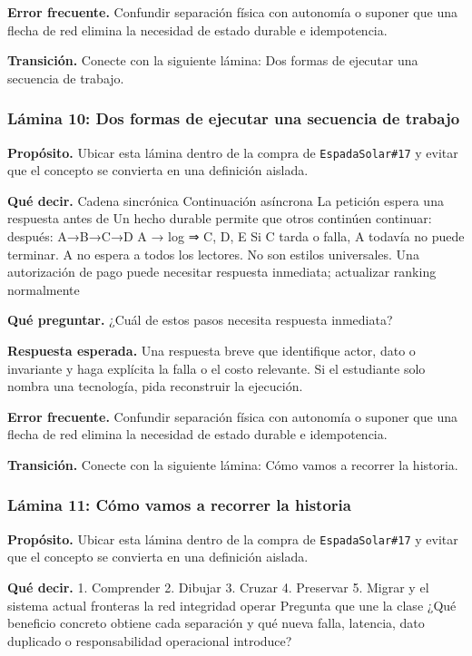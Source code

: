 \documentclass[variant=docente,cover=institutional,mode=screen]{ua-engineering-v6-article}
\begin{document}
\textbf{Error frecuente.} Confundir separación física con autonomía o suponer que una flecha de red elimina la necesidad de estado durable e idempotencia.

\textbf{Transición.} Conecte con la siguiente lámina: Dos formas de ejecutar una secuencia de trabajo.

\subsubsection*{Lámina 10: Dos formas de ejecutar una secuencia de trabajo}
\textbf{Propósito.} Ubicar esta lámina dentro de la compra de \texttt{EspadaSolar\#17} y evitar que el concepto se convierta en una definición aislada.

\textbf{Qué decir.} Cadena sincrónica Continuación asíncrona La petición espera una respuesta antes de Un hecho durable permite que otros continúen continuar: después: A→B→C→D A → log ⇒ {C, D, E} Si C tarda o falla, A todavía no puede terminar. A no espera a todos los lectores. No son estilos universales. Una autorización de pago puede necesitar respuesta inmediata; actualizar ranking normalmente 

\textbf{Qué preguntar.} ¿Cuál de estos pasos necesita respuesta inmediata?

\textbf{Respuesta esperada.} Una respuesta breve que identifique actor, dato o invariante y haga explícita la falla o el costo relevante. Si el estudiante solo nombra una tecnología, pida reconstruir la ejecución.

\textbf{Error frecuente.} Confundir separación física con autonomía o suponer que una flecha de red elimina la necesidad de estado durable e idempotencia.

\textbf{Transición.} Conecte con la siguiente lámina: Cómo vamos a recorrer la historia.

\subsubsection*{Lámina 11: Cómo vamos a recorrer la historia}
\textbf{Propósito.} Ubicar esta lámina dentro de la compra de \texttt{EspadaSolar\#17} y evitar que el concepto se convierta en una definición aislada.

\textbf{Qué decir.} 1. Comprender 2. Dibujar 3. Cruzar 4. Preservar 5. Migrar y el sistema actual fronteras la red integridad operar Pregunta que une la clase ¿Qué beneficio concreto obtiene cada separación y qué nueva falla, latencia, dato duplicado o responsabilidad operacional introduce?
\end{document}
